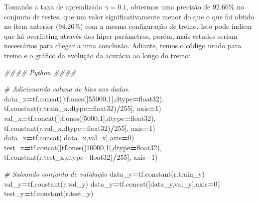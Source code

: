 \documentclass[
]{article}
\newenvironment{Shaded}{\begin{snugshade}}{\end{snugshade}}
\newcommand{\CommentTok}[1]{\textcolor[rgb]{0.56,0.35,0.01}{\textit{#1}}}
\newcommand{\DecValTok}[1]{\textcolor[rgb]{0.00,0.00,0.81}{#1}}
\newcommand{\NormalTok}[1]{#1}
\newcommand{\OperatorTok}[1]{\textcolor[rgb]{0.81,0.36,0.00}{\textbf{#1}}}
\newcommand{\StringTok}[1]{\textcolor[rgb]{0.31,0.60,0.02}{#1}}
\begin{document}
Tomando a taxa de aprendizado \(\gamma=0.1\), obtermos uma precisão de
\(92.66\%\) no conjunto de testes, que um valor significativamente menor
do que o que foi obtido no item anterior (\(94.26\%\)) com a mesma
configuração de treino. Isto pode indicar que há overfitting através dos
hiper-parâmetros, porém, mais estudos seriam necessários para chegar a
uma conclusão. Adiante, temos o código usado para treino e o gráfico da
evolução da acurácia ao longo do treino:

\begin{Shaded}
\begin{Highlighting}[]
\CommentTok{\#\#\#\# Python \#\#\#\#}

\CommentTok{\# Adicionando coluna de bias aos dados.}
\NormalTok{data\_x}\OperatorTok{=}\NormalTok{tf.concat([tf.ones([}\DecValTok{55000}\NormalTok{,}\DecValTok{1}\NormalTok{],dtype}\OperatorTok{=}\StringTok{\textquotesingle{}float32\textquotesingle{}}\NormalTok{),}
\NormalTok{                  tf.constant(r.train\_x,dtype}\OperatorTok{=}\StringTok{\textquotesingle{}float32\textquotesingle{}}\NormalTok{)}\OperatorTok{/}\DecValTok{255}\NormalTok{],}
\NormalTok{                axis}\OperatorTok{=}\DecValTok{1}\NormalTok{)}
\NormalTok{val\_x}\OperatorTok{=}\NormalTok{tf.concat([tf.ones([}\DecValTok{5000}\NormalTok{,}\DecValTok{1}\NormalTok{],dtype}\OperatorTok{=}\StringTok{\textquotesingle{}float32\textquotesingle{}}\NormalTok{),}
\NormalTok{                 tf.constant(r.val\_x,dtype}\OperatorTok{=}\StringTok{\textquotesingle{}float32\textquotesingle{}}\NormalTok{)}\OperatorTok{/}\DecValTok{255}\NormalTok{],}
\NormalTok{                axis}\OperatorTok{=}\DecValTok{1}\NormalTok{)}
\NormalTok{data\_x}\OperatorTok{=}\NormalTok{tf.concat([data\_x,val\_x],axis}\OperatorTok{=}\DecValTok{0}\NormalTok{)}
\NormalTok{test\_x}\OperatorTok{=}\NormalTok{tf.concat([tf.ones([}\DecValTok{10000}\NormalTok{,}\DecValTok{1}\NormalTok{],dtype}\OperatorTok{=}\StringTok{\textquotesingle{}float32\textquotesingle{}}\NormalTok{),}
\NormalTok{                  tf.constant(r.test\_x,dtype}\OperatorTok{=}\StringTok{\textquotesingle{}float32\textquotesingle{}}\NormalTok{)}\OperatorTok{/}\DecValTok{255}\NormalTok{],}
\NormalTok{                axis}\OperatorTok{=}\DecValTok{1}\NormalTok{)}
              
\CommentTok{\# Salvando conjunto de validação}
\NormalTok{data\_y}\OperatorTok{=}\NormalTok{tf.constant(r.train\_y)}
\NormalTok{val\_y}\OperatorTok{=}\NormalTok{tf.constant(r.val\_y)}
\NormalTok{data\_y}\OperatorTok{=}\NormalTok{tf.concat([data\_y,val\_y],axis}\OperatorTok{=}\DecValTok{0}\NormalTok{)}
\NormalTok{test\_y}\OperatorTok{=}\NormalTok{tf.constant(r.test\_y)}


\end{Highlighting}
\end{Shaded}
\end{document}
